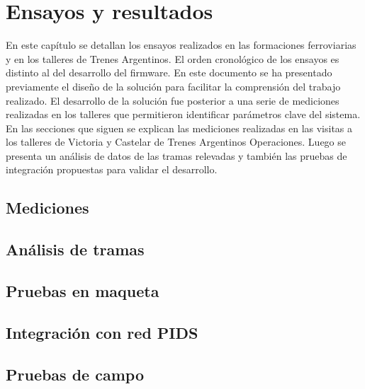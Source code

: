 
\chapter{Ensayos y resultados} %
En este capítulo se detallan los ensayos realizados en las formaciones ferroviarias y en los talleres de Trenes Argentinos. El orden cronológico de los ensayos es distinto al del desarrollo del firmware. En este documento se ha presentado previamente el diseño de la solución para facilitar la comprensión del trabajo realizado. El desarrollo de la solución fue posterior a una serie de mediciones realizadas en los talleres que permitieron identificar parámetros clave del sistema. \\

En las secciones que siguen se explican las mediciones realizadas en las visitas a los talleres de Victoria y Castelar de Trenes Argentinos Operaciones. Luego se presenta un análisis de datos de las tramas relevadas y también las pruebas de integración propuestas para validar el desarrollo. \\


\label{Chapter4} %


\section{Mediciones}
\pagebreak

\section{Análisis de tramas}

\pagebreak
\section{Pruebas en maqueta}

\pagebreak
\section{Integración con red PIDS}

\pagebreak
\section{Pruebas de campo}